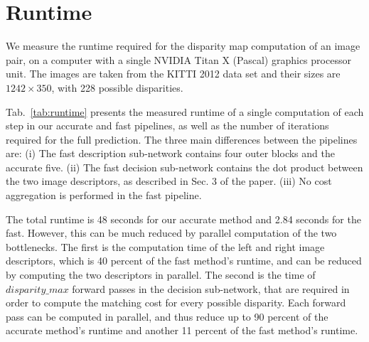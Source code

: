 \documentclass[10pt, twocolumn, letterpaper]{article}
\begin{document}
\section{Runtime}

We measure the runtime required for the disparity map computation of an image pair, on a computer with a single NVIDIA Titan X (Pascal) graphics processor unit. The images are taken from the KITTI 2012 data set and their sizes are $1242\times 350$, with 228 possible disparities. 

Tab.~\ref{tab:runtime} presents the measured runtime of a single computation of each step in our accurate and fast pipelines, as well as the number of iterations required for the full prediction. The three main differences between the pipelines are: (i) The fast description sub-network contains four outer blocks and the accurate five. (ii) The fast decision sub-network contains the dot product between the two image descriptors, as described in Sec. 3 of the paper. (iii) No cost aggregation is performed in the fast pipeline. 

The total runtime is 48 seconds for our accurate method and 2.84 seconds for the fast. However, this can be much reduced by parallel computation of the two bottlenecks.
The first is the computation time of the left and right image descriptors, which is 40 percent of the fast method's runtime, and can be reduced by computing the two descriptors in parallel. The second is the time of $disparity\_max$ forward passes in the decision sub-network, that are required in order to compute the matching cost for every possible disparity. Each forward pass can be computed in parallel, and thus reduce up to 90 percent of the accurate method's runtime and another 11 percent of the fast method's runtime. 
\end{document}
